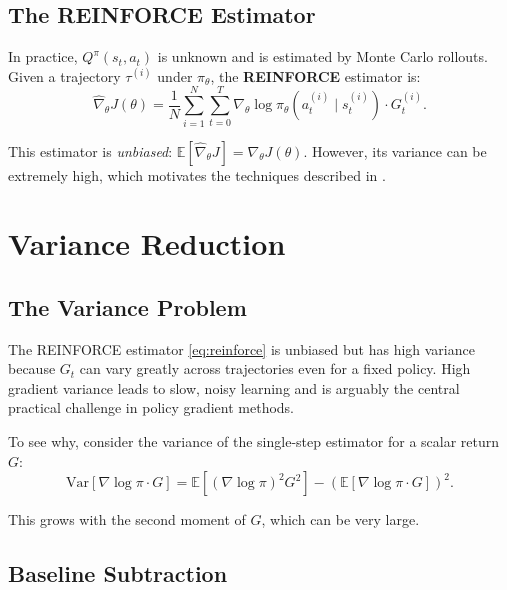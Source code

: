\documentclass[11pt, a4paper]{article}
\newcommand{\E}{\mathbb{E}}
\newcommand{\grad}{\nabla}
\newcommand{\hgrad}{\hat{\nabla}}
\begin{document}
\subsection{The REINFORCE Estimator}

In practice, $Q^\pi(s_t, a_t)$ is unknown and is estimated by Monte Carlo rollouts.
Given a trajectory $\tau^{(i)}$ under $\pi_\theta$, the \textbf{REINFORCE} estimator
\citep{williams1992} is:
\begin{equation}
    \hgrad_\theta J(\theta) = \frac{1}{N} \sum_{i=1}^{N} \sum_{t=0}^{T}
    \grad_\theta \log \pi_\theta(a_t^{(i)} \mid s_t^{(i)}) \cdot G_t^{(i)}.
    \label{eq:reinforce}
\end{equation}

This estimator is \emph{unbiased}: $\E[\hgrad_\theta J] = \grad_\theta J(\theta)$.
However, its variance can be extremely high, which motivates the techniques
described in .

\section{Variance Reduction}
\label{sec:variance}

\subsection{The Variance Problem}

The REINFORCE estimator \eqref{eq:reinforce} is unbiased but has high variance
because $G_t$ can vary greatly across trajectories even for a fixed policy.
High gradient variance leads to slow, noisy learning and is arguably the
central practical challenge in policy gradient methods.

To see why, consider the variance of the single-step estimator for a scalar return $G$:
\begin{equation}
    \mathrm{Var}\left[ \grad \log \pi \cdot G \right]
    = \E\left[ (\grad \log \pi)^2 G^2 \right] - \left(\E[\grad \log \pi \cdot G]\right)^2.
\end{equation}

This grows with the second moment of $G$, which can be very large.

\subsection{Baseline Subtraction}
\end{document}
